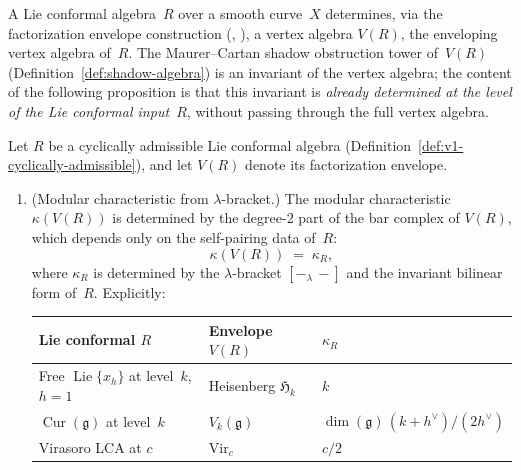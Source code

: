 A Lie conformal algebra~$R$ over a smooth curve~$X$ determines,
via the factorization envelope construction
\textup{(}\cite[\S3.7]{BD04}, \cite{CG17}\textup{)}, a vertex algebra
$V(R)$, the enveloping vertex algebra of~$R$.
The Maurer--Cartan shadow obstruction tower of~$V(R)$
(Definition~\ref{def:shadow-algebra}) is an invariant of the
vertex algebra; the content of the following proposition is that
this invariant is \emph{already determined at the level of the
Lie conformal input~$R$}, without passing through the full
vertex algebra.

\begin{proposition}
\label{prop:envelope-shadow}
Let $R$ be a cyclically admissible Lie conformal algebra
\textup{(}Definition~\textup{\ref{def:v1-cyclically-admissible})},
and let $V(R)$ denote its factorization envelope.
\begin{enumerate}[label=\textup{(\roman*)}]
\item \textup{(Modular characteristic from $\lambda$-bracket.)}
 The modular characteristic $\kappa(V(R))$ is determined by
 the degree-$2$ part of the bar complex of $V(R)$, which depends
 only on the self-pairing data of~$R$:
 \[
 \kappa(V(R))
 \;=\;
 \kappa_R,
 \]
 where $\kappa_R$ is determined by the $\lambda$-bracket
 $[{-}_\lambda\, {-}]$ and the invariant bilinear form of~$R$.
 Explicitly:
 \begin{center}
 \renewcommand{\arraystretch}{1.25}
 \begin{tabular}{lll}
 Lie conformal $R$ & Envelope $V(R)$ & $\kappa_R$ \\
 \hline
 Free $\operatorname{Lie}\{x_h\}$ at level~$k$, $h = 1$
 & Heisenberg $\mathfrak{H}_k$ & $k$ \\
 $\operatorname{Cur}(\mathfrak{g})$ at level~$k$
 & $V_k(\mathfrak{g})$
 & $\dim(\mathfrak{g})\,(k + h^\vee)/(2h^\vee)$ \\
 Virasoro LCA at $c$
 & $\mathrm{Vir}_c$
 & $c/2$
 \end{tabular}
 \end{center}


\end{enumerate}
\end{proposition}
